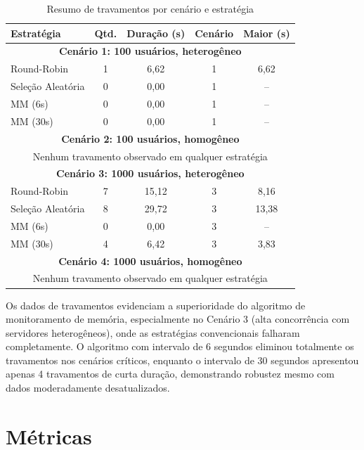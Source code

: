 \begin{table}[htbp]
\centering
\caption{Resumo de travamentos por cenário e estratégia}
\label{tab:stalls-results}
\small
\begin{tabular}{|l|c|c|c|c|}
\hline
\textbf{Estratégia} & \textbf{Qtd.} & \textbf{Duração (s)} & \textbf{Cenário} & \textbf{Maior (s)} \\
\hline
\multicolumn{5}{|c|}{\textbf{Cenário 1: 100 usuários, heterogêneo}} \\
\hline
Round-Robin & 1 & 6,62 & 1 & 6,62 \\
Seleção Aleatória & 0 & 0,00 & 1 & -- \\
MM (6s) & 0 & 0,00 & 1 & -- \\
MM (30s) & 0 & 0,00 & 1 & -- \\
\hline
\multicolumn{5}{|c|}{\textbf{Cenário 2: 100 usuários, homogêneo}} \\
\hline
\multicolumn{5}{|c|}{Nenhum travamento observado em qualquer estratégia} \\
\hline
\multicolumn{5}{|c|}{\textbf{Cenário 3: 1000 usuários, heterogêneo}} \\
\hline
Round-Robin & 7 & 15,12 & 3 & 8,16 \\
Seleção Aleatória & 8 & 29,72 & 3 & 13,38 \\
MM (6s) & 0 & 0,00 & 3 & -- \\
MM (30s) & 4 & 6,42 & 3 & 3,83 \\
\hline
\multicolumn{5}{|c|}{\textbf{Cenário 4: 1000 usuários, homogêneo}} \\
\hline
\multicolumn{5}{|c|}{Nenhum travamento observado em qualquer estratégia} \\
\hline
\end{tabular}
\end{table}

Os dados de travamentos evidenciam a superioridade do algoritmo de monitoramento de memória, especialmente no Cenário 3 (alta concorrência com servidores heterogêneos), onde as estratégias convencionais falharam completamente. O algoritmo com intervalo de 6 segundos eliminou totalmente os travamentos nos cenários críticos, enquanto o intervalo de 30 segundos apresentou apenas 4 travamentos de curta duração, demonstrando robustez mesmo com dados moderadamente desatualizados.

\section{Métricas}

